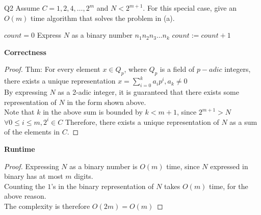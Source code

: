 \begin{problem}
  {Q2}
  Assume $C = 1, 2, 4, \dots, 2^m$ and $N < 2^{m+1}$. For this special case, give an $O(m)$ time algorithm that solves the problem in (a). \\
  \begin{algorithmic}[1]
    \STATE $count = 0$
    \STATE Express $N$ as a binary number $n_1n_2n_3\dots n_k$
    \STATE $count := count + 1$
    \ENDIF
    \ENDFOR
  \end{algorithmic}
  \noindent
  \textbf{Correctness}
  \begin{proof}
      Thm: For every element $x \in Q_p$, where $Q_p$ is a field of $p-adic$ integers,
      there exists a unique representation $x = \sum_{i = 0}^{k} a_ip^i, a_k \neq 0$ \\
      By expressing $N$ as a 2-adic integer, it is guaranteed that there exists some
      representation of $N$ in the form shown above. \\
      Note that $k$ in the above sum is bounded by $k < m+1$, since $2^{m+1} > N$ \\
      $\forall 0 \leq i \leq m, 2^i \in C$
      Therefore, there exists a unique representation of $N$ as a sum of the elements in $C$.
  \end{proof}
  \noindent
  \textbf{Runtime}
  \begin{proof}
      Expressing $N$ as a binary number is $O(m)$ time, since $N$ expressed in binary has at most $m$ digits. \\
      Counting the $1$'s in the binary representation of $N$ takes $O(m)$ time, for the above reason.\\
      The complexity is therefore $O(2m) = O(m)$
  \end{proof}
\end{problem}

